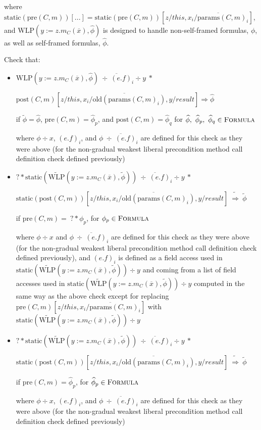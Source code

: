 \documentclass {article}
\newcommand{\fphi}{\widehat{\phi}}
\newcommand{\tphi}{\widetilde{\phi}}
\newcommand{\imp}{\Rightarrow}
\newcommand{\timp}{\ \widetilde{\Rightarrow}\ }
\newcommand{\pre}{\text{pre}(C,m)}
\newcommand{\presub}{\text{pre}(C,m)\left[z/this, \overline{x_i/\text{params}(C,m)_i}\right]}
\newcommand{\post}{\text{post}(C,m)}
\newcommand{\postsub}{\text{post}(C,m)\left[z/this, \overline{x_i/\text{old}(\text{params}(C,m)_i)},y/result\right]}
\newcommand{\wlp}[2]{\text{WLP}(#1,#2)}
\newcommand{\twlp}[2]{\widetilde{\text{WLP}}(#1,#2)}
\newcommand{\formuladef}{\textsc{Formula}}
\begin{document}
where $\text{static}(\pre)[...] = \text{static}(\pre)\left[z/this, \overline{x_i/\text{params}(C,m)_i}\right]$, and $\wlp{y := z.m_C(\overline{x})}{\fphi}$ is designed to handle non-self-framed formulas, $\phi$, as well as self-framed formulas, $\fphi$.

Check that:

\begin{itemize}
\item $\wlp{y := z.m_C(\overline{x})}{\fphi} \overline{\ \div \ (e.f)_i} \div y \ \ast $

\hspace{0.5cm} $ \postsub \imp \fphi$

if $\tphi = \fphi$, $\pre = \fphi_p$, and $\post = \fphi_q$ for $\fphi, \ \fphi_p, \ \fphi_q \in \formuladef$

where $\phi \div x$, $(e.f)_i$, and $\phi \overline{\ \div \ (e.f)_i}$ are defined for this check as they were above (for the non-gradual weakest liberal precondition method call definition check defined previously)

\item $? \ast \text{static}(\twlp{y := z.m_C(\overline{x})}{\tphi}) \overline{\ \div \ (e.f)_i} \div y \ \ast$

\hspace{0.5cm} $\text{static}(\post)\left[z/this, \overline{x_i/\text{old}(\text{params}(C,m)_i)},y/result\right] \timp \tphi$

if $\pre = \ ? \ast \phi_p$, for $\phi_p \in \formuladef$

where $\phi \div x$ and $\phi \overline{\ \div \ (e.f)_i}$ are defined for this check as they were above (for the non-gradual weakest liberal precondition method call definition check defined previously), and $(e.f)_i$ is defined as a field access used in $\text{static}(\twlp{y := z.m_C(\overline{x})}{\tphi}) \div y$ and coming from a list of field accesses used in $\text{static}(\twlp{y := z.m_C(\overline{x})}{\tphi}) \div y$ computed in the same way as the above check except for replacing $\presub$ with \\ $\text{static}(\twlp{y := z.m_C(\overline{x})}{\tphi}) \div y$

\item $? \ast \text{static}(\twlp{y := z.m_C(\overline{x})}{\tphi}) \overline{\ \div \ (e.f)_i} \div y \ \ast$

\hspace{0.5cm} $\text{static}(\post)\left[z/this, \overline{x_i/\text{old}(\text{params}(C,m)_i)},y/result\right] \timp \tphi$

if $\pre = \fphi_p$, for $\fphi_p \in \formuladef$ 

where $\phi \div x$, $(e.f)_i$, and $\phi \overline{\ \div \ (e.f)_i}$ are defined for this check as they were above (for the non-gradual weakest liberal precondition method call definition check defined previously)
\end{itemize}
\end{document}
